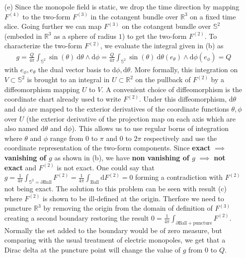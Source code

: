 \documentclass[10pt, a4paper]{article}
\begin{document}
{\begin{enumerate}
\begin{align*}
  \end{align*}
  We note the electric field components (associated to $\text{d}x^{i} \wedge \text{d}t$) all vanish and we only have a magnetic field (associated to $\text{d}x^i \wedge \text{d}x^j$). The magnetic field has the same form as an electric monopole (inverse square law multiplies by a unit "vector").
  \item[(e)] Since the monopole field is static, we drop the time direction by mapping $F^{(4)}$ to the two-form $F^{(3)}$ in the cotangent bundle over $\mathbb{R}^3$ on a fixed time slice. Going further we can map $F^{(3)}$ on the cotangent bundle over $\mathbb{S}^2$ (embeded in $\mathbb{R}^3$ as a sphere of radius $1$) to get the two-form $F^{(2)}$. To characterize the two-form $F^{(2)}$, we evaluate the integral given in (b) as 
  \begin{align*}
  g = \frac{Q}{4\pi}\int_{\mathbb{S}^2} \sin(\theta) \ \text{d} \theta \wedge \text{d}\phi = \frac{Q}{4\pi}\int_{\mathbb{S}^2} \sin(\theta) \ \text{d} \theta (e_\theta) \wedge \text{d}\phi (e_\phi) = Q
  \end{align*}
  with $e_{\phi}, e_\theta$ the dual vector basis to $\text{d} \phi, \text{d} \theta$. More formally, this integration on $V\subset\mathbb{S}^2$ is brought to an integral in $U\subset\mathbb{R}^2$ on the pullback of $F^{(2)}$ by a diffeomorphism mapping $U$ to $V$. A convenient choice of diffeomorphism is the coordinate chart already used to write $F^{(2)}$. Under this diffeomorphism, $\text{d}\theta$ and $\text{d}\phi$ are mapped to the exterior derivatives of the coordinate functions $\theta, \phi$ over $U$ (the exterior derivative of the projection map on each axis which are also named $\text{d}\theta$ and $\text{d}\phi$). This allows us to use regular borns of integration where $\theta$ and $\phi$ range from $0$ to $\pi$ and $0$ to $2\pi$ respectively and use the coordinate representation of the two-form components. Since \textbf{exact} $\implies$ \textbf{vanishing of $g$} as shown in (b), we have \textbf{non vanishing of $g$} $\implies$ \textbf{not exact} and $F^{(2)}$ is not exact. One could say that $g= \frac{1}{4\pi} \int_{\mathbb{S}^2 = \partial \text{Ball}} F^{(2)} = \frac{1}{4\pi} \int_{\text{Ball}} \text{d}F^{(2)} = 0$ forming a contradiction with $F^{(2)}$ not being exact. The solution to this problem can be seen with result (c) where $F^{(2)}$ is shown to be ill-defined at the origin. Therfore we need to puncture $\mathbb{R}^3$ by removing the origin from the domain of definition of $F^{(3)}$ creating a second boundary restoring the result $0 = \frac{1}{4\pi} \int_{\partial \text{Ball} + \text{puncture}} F^{(2)}$. Normally the set added to the boundary would be of zero measure, but comparing with the usual treatment of electric monopoles, we get that a Dirac delta at the puncture point will change the value of $g$ from $0$ to $Q$. 

\end{enumerate}}
\end{document}
